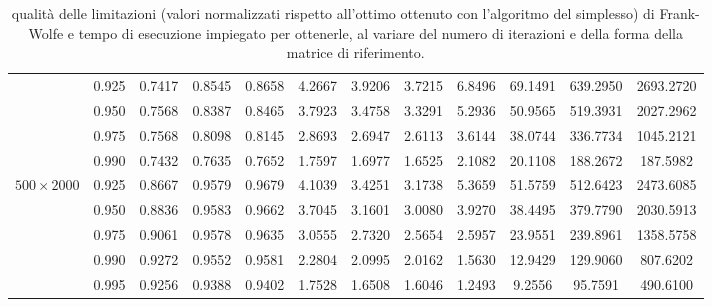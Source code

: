 \begin{landscape}
\begin{table}[!h]
\begin{tabularx}{659.32144pt}{cccccccccccc}
        & 0.925 & 0.7417 & 0.8545 & 0.8658 & 4.2667 & 3.9206 & 3.7215 & 6.8496 & 69.1491 & 639.2950 & 2693.2720 \\
        & 0.950 & 0.7568 & 0.8387 & 0.8465 & 3.7923 & 3.4758 & 3.3291 & 5.2936 & 50.9565 & 519.3931 & 2027.2962 \\
        & 0.975 & 0.7568 & 0.8098 & 0.8145 & 2.8693 & 2.6947 & 2.6113 & 3.6144 & 38.0744 & 336.7734 & 1045.2121 \\
        & 0.990 & 0.7432 & 0.7635 & 0.7652 & 1.7597 & 1.6977 & 1.6525 & 2.1082 & 20.1108 & 188.2672 & 187.5982 \\
        \midrule
        \( 500\times 2000 \)
        & 0.925 & 0.8667 & 0.9579 & 0.9679 & 4.1039 & 3.4251 & 3.1738 & 5.3659 & 51.5759 & 512.6423 & 2473.6085 \\
        & 0.950 & 0.8836 & 0.9583 & 0.9662 & 3.7045 & 3.1601 & 3.0080 & 3.9270 & 38.4495 & 379.7790 & 2030.5913 \\
        & 0.975 & 0.9061 & 0.9578 & 0.9635 & 3.0555 & 2.7320 & 2.5654 & 2.5957 & 23.9551 & 239.8961 & 1358.5758 \\
        & 0.990 & 0.9272 & 0.9552 & 0.9581 & 2.2804 & 2.0995 & 2.0162 & 1.5630 & 12.9429 & 129.9060 & 807.6202 \\
        & 0.995 & 0.9256 & 0.9388 & 0.9402 & 1.7528 & 1.6508 & 1.6046 & 1.2493 & 9.2556 & 95.7591 & 490.6100 \\
        \bottomrule
    \end{tabularx}
    \caption{qualità delle limitazioni (valori normalizzati rispetto all'ottimo ottenuto con l'algoritmo del simplesso)
    di Frank-Wolfe e tempo di esecuzione impiegato per ottenerle, al variare del numero di iterazioni e della forma
    della matrice di riferimento.}
    \label{table:hugetable4}
\end{table}
\end{landscape}
